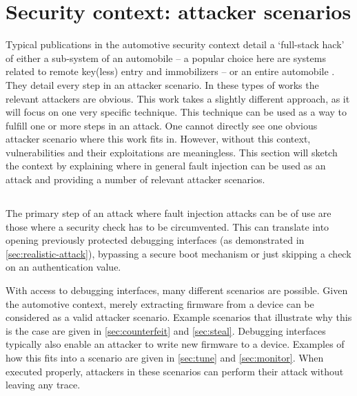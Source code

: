 \documentclass[10pt]{article}
\begin{document}
\section{Security context: attacker scenarios }
\label{sec:attacker-scenarios}
      Typical publications in the automotive security context detail a `full-stack hack' of either a sub-system of an automobile -- a popular choice here are systems related to remote key(less) entry and immobilizers \cite{garcia_lock_2016,kasper_breaking_2009,verdult_dismantling_2015} -- or an entire automobile \cite{checkoway_comprehensive_2011,koscher_experimental_2010}. They detail every step in an attacker scenario. In these types of works the relevant attackers are obvious. This work takes a slightly different approach, as it will focus on one very specific technique. This technique can be used as a way to fulfill one or more steps in an attack. One cannot directly see one obvious attacker scenario where this work fits in. However, without this context, vulnerabilities and their exploitations are meaningless. This section will sketch the context by explaining where in general fault injection can be used as an attack and providing a number of relevant attacker scenarios. 

  \subsection*{}
      The primary step of an attack where fault injection attacks can be of use are those where a security check has to be circumvented. This can translate into opening previously protected debugging interfaces (as demonstrated in \autoref{sec:realistic-attack}), bypassing a secure boot mechanism or just skipping a check on an authentication value.

      With access to debugging interfaces, many different scenarios are possible. Given the automotive context, merely extracting firmware from a device can be considered as a valid attacker scenario.  Example scenarios that illustrate why this is the case are given in \autoref{sec:counterfeit} and \autoref{sec:steal}. Debugging interfaces typically also enable an attacker to write new firmware to a device. Examples of how this fits into a scenario are given in \autoref{sec:tune} and \autoref{sec:monitor}. When executed properly, attackers in these scenarios can perform their attack without leaving any trace. 
\end{document}
